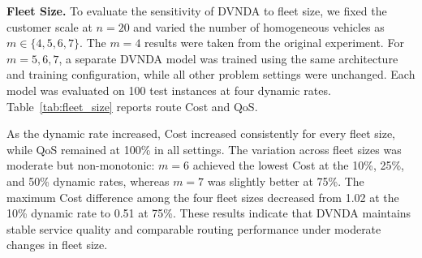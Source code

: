 \noindent\textbf{Fleet Size.}
To evaluate the sensitivity of DVNDA to fleet size, we fixed the customer
scale at $n=20$ and varied the number of homogeneous vehicles as
$m\in\{4,5,6,7\}$. The $m=4$ results were taken from the original experiment.
For $m=5,6,7$, a separate DVNDA model was trained using the same architecture
and training configuration, while all other problem settings were unchanged.
Each model was evaluated on 100 test instances at four dynamic rates.
Table~\ref{tab:fleet_size} reports route Cost and QoS.



As the dynamic rate increased, Cost increased consistently for every fleet
size, while QoS remained at 100\% in all settings. The variation across fleet
sizes was moderate but non-monotonic: $m=6$ achieved the lowest Cost at the
10\%, 25\%, and 50\% dynamic rates, whereas $m=7$ was slightly better at 75\%.
The maximum Cost difference among the four fleet sizes decreased from 1.02 at
the 10\% dynamic rate to 0.51 at 75\%. These results indicate that DVNDA
maintains stable service quality and comparable routing performance under
moderate changes in fleet size.
